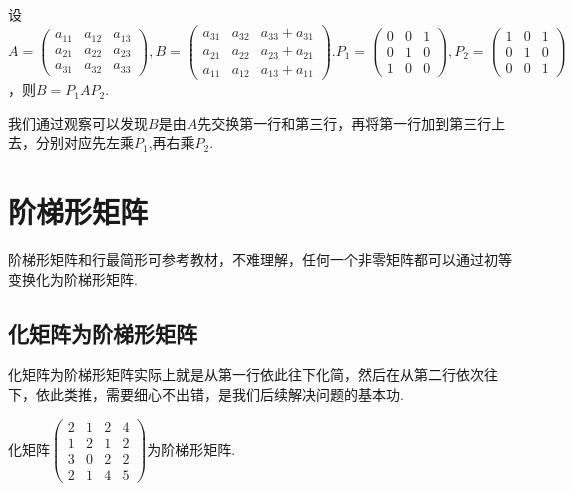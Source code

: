 \begin{example}
	设$A=\begin{pmatrix}
			a_{11} & a_{12} & a_{13} \\
			a_{21} & a_{22} & a_{23} \\
			a_{31} & a_{32} & a_{33}
		\end{pmatrix},B=\begin{pmatrix}
			a_{31} & a_{32} & a_{33}+a_{31} \\
			a_{21} & a_{22} & a_{23}+a_{21} \\
			a_{11} & a_{12} & a_{13}+a_{11}
		\end{pmatrix}.P_1=\begin{pmatrix}
			0 & 0 & 1 \\
			0 & 1 & 0 \\
			1 & 0 & 0
		\end{pmatrix},P_2=\begin{pmatrix}
			1 & 0 & 1 \\
			0 & 1 & 0 \\
			0 & 0 & 1
		\end{pmatrix}$，则$B=P_1AP_2$.
\end{example}

\begin{solution}
	我们通过观察可以发现$B$是由$A$先交换第一行和第三行，再将第一行加到第三行上去，分别对应先左乘$P_1$,再右乘$P_2$.
\end{solution}

\section{阶梯形矩阵}
阶梯形矩阵和行最简形可参考教材，不难理解，任何一个非零矩阵都可以通过初等变换化为阶梯形矩阵.
\subsection{化矩阵为阶梯形矩阵}

化矩阵为阶梯形矩阵实际上就是从第一行依此往下化简，然后在从第二行依次往下，依此类推，需要细心不出错，是我们后续解决问题的基本功.

\begin{example}
	化矩阵$\begin{pmatrix}
			2 & 1 & 2 & 4 \\
			1 & 2 & 1 & 2 \\
			3 & 0 & 2 & 2 \\
			2 & 1 & 4 & 5
		\end{pmatrix}$为阶梯形矩阵.
\end{example}

